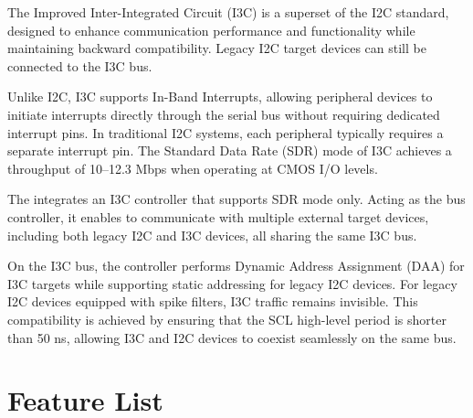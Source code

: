 \documentclass[main\_\_EN.tex]{subfiles}
\begin{document}
The Improved Inter-Integrated Circuit (I3C) is a superset of the I2C standard, designed to enhance communication performance and functionality while maintaining backward compatibility. Legacy I2C target devices can still be connected to the I3C bus.

Unlike I2C, I3C supports In-Band Interrupts, allowing peripheral devices to initiate interrupts directly through the serial bus without requiring dedicated interrupt pins. In traditional I2C systems, each peripheral typically requires a separate interrupt pin. The Standard Data Rate (SDR) mode of I3C achieves a throughput of 10–12.3 Mbps when operating at CMOS I/O levels.

The \chipname{} integrates an I3C controller that supports SDR mode only. Acting as the bus controller, it enables \chipname{} to communicate with multiple external target devices, including both legacy I2C and I3C devices, all sharing the same I3C bus.

On the I3C bus, the controller performs Dynamic Address Assignment (DAA) for I3C targets while supporting static addressing for legacy I2C devices. For legacy I2C devices equipped with spike filters, I3C traffic remains invisible. This compatibility is achieved by ensuring that the SCL high-level period is shorter than 50 ns, allowing I3C and I2C devices to coexist seamlessly on the same bus.



\vspace{2em}


\section{Feature List}
\label{sec:i3c-features}
\end{document}
